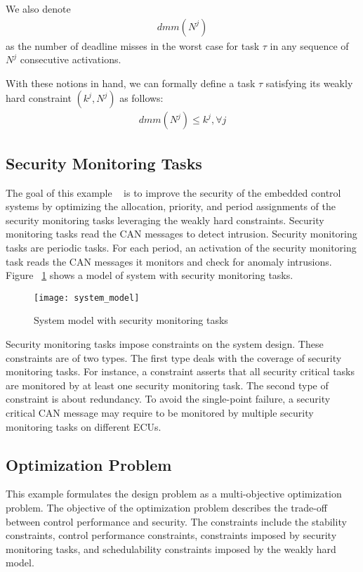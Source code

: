 We also denote
\begin{align*}
dmm(N^j)
\end{align*}
as the number of deadline misses in the worst case for task $\tau$ in any sequence of $N^j$ consecutive activations.

With these notions in hand, we can formally define a task $\tau$ satisfying its weakly hard constraint $(k^{j}, N^{j})$ as follows:
\begin{align*}
dmm(N^j) \le k^j, \forall j
\end{align*}

\subsection{Security Monitoring Tasks}
The goal of this example ~\cite{liang2019security} is to improve the security of the embedded control systems by optimizing the allocation, priority, and period assignments of the security monitoring tasks leveraging the weakly hard constraints. Security monitoring tasks read the CAN messages to detect intrusion. Security monitoring tasks are periodic tasks. For each period, an activation of the security monitoring task reads the CAN messages it monitors and check for anomaly intrusions. Figure ~\ref{fig:system_model} shows a model of system with security monitoring tasks.

\begin{figure}[h!]
\caption{System model with security monitoring tasks~\cite{liang2019security}}
\centering
\texttt{[image: system\_model]}
\label{fig:system_model}
\end{figure}

Security monitoring tasks impose constraints on the system design. These constraints are of two types. The first type deals with the coverage of security monitoring tasks. For instance, a constraint asserts that all security critical tasks are monitored by at least one security monitoring task. The second type of constraint is about redundancy. To avoid the single-point failure, a security critical CAN message may require to be monitored by multiple security monitoring tasks on different ECUs. 

\subsection{Optimization Problem}
This example formulates the design problem as a multi-objective optimization problem. The objective of the optimization problem describes the trade-off between control performance and security. The constraints include the stability constraints, control performance constraints, constraints imposed by security monitoring tasks, and schedulability constraints imposed by the weakly hard model.










